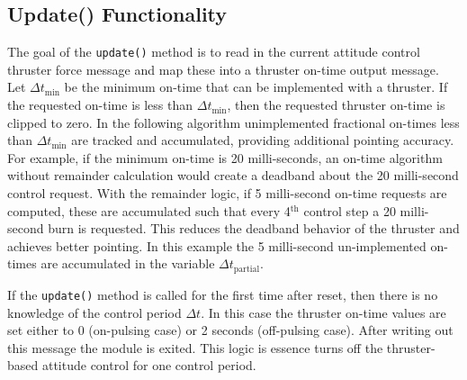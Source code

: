 \subsection{Update() Functionality}
The goal of the {\tt update()} method is to read in the current attitude control thruster force message and map these into a thruster on-time output message.  Let $\Delta t_{\text{min}}$ be the minimum on-time that can be implemented with a thruster.  If the requested on-time is less than $\Delta t_{\text{min}}$, then the requested thruster on-time is clipped to zero.  In the following algorithm unimplemented fractional on-times less than $\Delta t_{\text{min}}$ are tracked and accumulated, providing additional pointing accuracy.  For example, if the minimum on-time is 20 milli-seconds, an on-time algorithm without remainder calculation would create a deadband about the 20 milli-second control request.  With the remainder logic, if 5 milli-second on-time requests are computed, these are accumulated such that every 4$^{\text{th}}$ control step a 20 milli-second burn is requested.  This reduces the deadband behavior of the thruster and achieves better pointing.  In this example the 5 milli-second un-implemented on-times are accumulated in the variable $\Delta t_{\text{partial}}$.  

If the {\tt update()} method is called for the first time after reset, then there is no knowledge of the control period $\Delta t$.  In this case the thruster on-time values are set either to 0 (on-pulsing case) or 2 seconds (off-pulsing case).  After writing out this message the module is exited.  This logic is essence turns off the thruster-based attitude control for one control period. 

